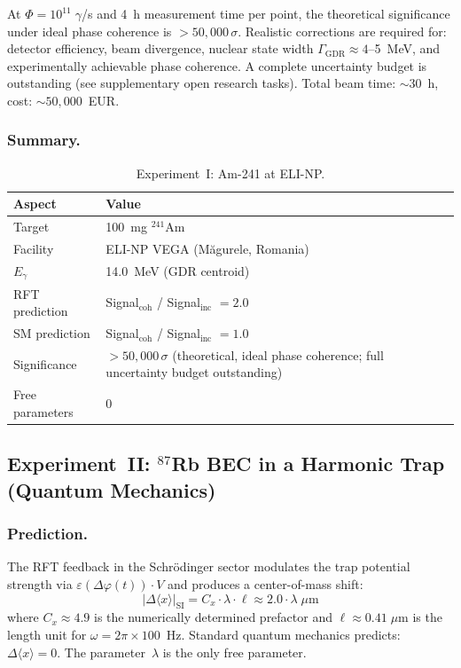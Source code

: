 \documentclass[12pt]{iopart}
\begin{document}
	At $\Phi = 10^{11}\;\gamma$/s and 4~h measurement time per
	point, the theoretical significance under ideal phase coherence is
	$> 50{,}000\,\sigma$. Realistic corrections are required for:
	detector efficiency, beam divergence, nuclear state width
	$\Gamma_{\mathrm{GDR}} \approx 4$--5~MeV, and experimentally
	achievable phase coherence. A complete uncertainty budget is
	outstanding (see supplementary open research tasks).
	Total beam time: ${\sim}30$~h, cost: ${\sim}50{,}000$~EUR.
	
	\subsubsection{Summary.}
	
	\begin{table}[ht]
		\centering
		\caption{Experiment~I: Am-241 at ELI-NP.}
		\label{tab:exp_am241}
		\begin{tabular}{ll}
			\hline
			\textbf{Aspect} & \textbf{Value} \\
			\hline
			Target & 100~mg ${}^{241}$Am \\
			Facility & ELI-NP VEGA
			(M\u{a}gurele, Romania) \\
			$E_\gamma$ & 14.0~MeV (GDR centroid) \\
			RFT prediction & Signal$_{\mathrm{coh}}$ /
			Signal$_{\mathrm{inc}}$ $= 2.0$ \\
			SM prediction & Signal$_{\mathrm{coh}}$ /
			Signal$_{\mathrm{inc}}$ $= 1.0$ \\
			Significance & $> 50{,}000\,\sigma$ (theoretical,
			ideal phase coherence; full uncertainty budget
			outstanding) \\
			Free parameters & $0$ \\
			\hline
		\end{tabular}
	\end{table}
	
	\subsection{Experiment~II: ${}^{87}$Rb BEC in a Harmonic
		Trap (Quantum Mechanics)}
	\label{sec:exp_rb87}
	
	\subsubsection{Prediction.}
	
	The RFT feedback in the Schr\"{o}dinger sector modulates
	the trap potential strength via
	$\varepsilon(\Delta\varphi(t)) \cdot V$ and produces a
	center-of-mass shift:
	\begin{equation}
		|\Delta\langle x\rangle|_{\mathrm{SI}}
		= C_x \cdot \lambda \cdot \ell
		\approx 2.0 \cdot \lambda\;\mu\mathrm{m}
		\label{eq:dx_rft}
	\end{equation}
	where $C_x \approx 4.9$ is the numerically determined
	prefactor and $\ell \approx 0.41\;\mu$m is the length
	unit for $\omega = 2\pi \times 100$~Hz.
	Standard quantum mechanics predicts:
	$\Delta\langle x\rangle = 0$. The parameter~$\lambda$
	is the only free parameter.
\end{document}
